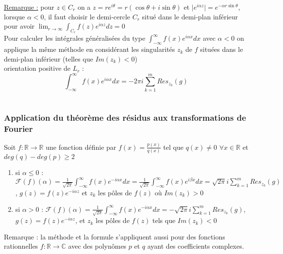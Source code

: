 \documentclass[../main.tex]{subfiles}
\begin{document}
 \color{gray} \underline{Remarque :} pour $z\in C_r$ on a $z=re^{i\theta} = r(\cos{\theta} + i\sin{\theta})$ et $\lvert e^{i\alpha z}\rvert = e^{-\alpha r \sin{\theta}}$, lorsque $\alpha < 0$, il faut choisir le demi-cercle $C_r$ situé dans le demi-plan inférieur pour avoir $\lim_{r\rightarrow \infty} \int_{C_r} f(z)e^{i\alpha z} dz = 0$\\

 Pour calculer les intégrales généralisées du type $\int_{-\infty}^\infty f(x) e^{i\alpha x}dx$ avec $\alpha < 0$ on applique la même méthode en considérant les singularités $z_k$ de $f$ situées dans le demi-plan inférieur (telles que $Im(z_k)<0$)\\
 \warning orientation positive de $L_r$ :\begin{equation}
     \int_{-\infty}^\infty f(x) e^{i\alpha x}dx = -2\pi i \sum_{k=1}^m Res_{z_k}(g)
 \end{equation}
\color{black}\\

\subsubsection{Application du théorème des résidus aux transformations de Fourier}
Soit $f:\mathbb{R}\rightarrow \mathbb{R}$ une fonction définie par $f(x) = \frac{p(x)}{q(x)}$ tel que $q(x) \neq 0$ $\forall x \in \mathbb{R}$ et $deg(q)-deg(p)\geq 2$\\

\begin{enumerate}
    \item si $\alpha\leq 0$ : $\mathcal{F}(f)(\alpha) = \frac{1}{\sqrt{2\pi}} \int_{-\infty}^\infty f(x)e^{-i\alpha x}dx = \frac{1}{\sqrt{2\pi}} \int_{-\infty}^\infty f(x) e^{i\beta x}dx = \sqrt{2\pi} i \sum_{k=1}^m Res_{z_k} (g)$, $g(z) = f(z) e^{-i\alpha z}$ et $z_k$ les pôles de $f(z)$ où $Im(z_k)>0$\\
    \item si $\alpha>0$ : $\mathcal{F}(f)(\alpha) = \frac{1}{\sqrt{2\pi}} \int_{-\infty}^\infty f(x)e^{-i\alpha x}dx = -\sqrt{2\pi} i \sum_{k=1}^m Res_{z_k}(g)$, $g(z) = f(z)e^{-i\alpha z}$, et $z_k$ les pôles de $f(z)$ tels que $Im(z_k)<0$\\ 
\end{enumerate}
\color{gray}Remarque : la méthode et la formule s'appliquent aussi pour des fonctions rationnelles $f:\mathbb{R} \rightarrow\mathbb{C}$ avec des polynômes $p$ et $q$  ayant des coefficients complexes.\color{black}\\
\end{document}
